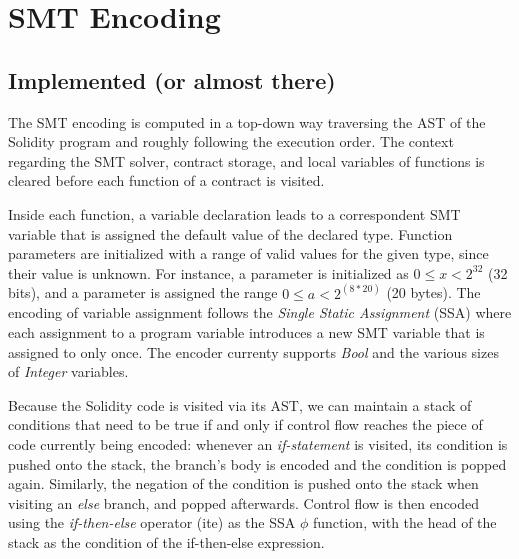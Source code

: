 \section{SMT Encoding}
\label{section:smt}

\subsection{Implemented (or almost there)}


The SMT encoding is computed in a top-down way traversing the AST of the
Solidity program and roughly following the execution order.
The context regarding the SMT solver, contract storage, and
local variables of functions is cleared before each function of a contract is
visited.

Inside each function, a variable declaration leads to a correspondent SMT
variable that is assigned the default value of the declared type.
%
Function parameters are initialized with a range of valid values for the given
type, since their value is unknown.  For instance, a parameter 
is initialized as $0 \le x < 2^{32}$ (32 bits), and a parameter  is assigned the range $0 \le a < 2^{(8*20)}$ (20 bytes).
%
The encoding of variable assignment follows the \emph{Single Static Assignment}
(SSA) where each assignment to a program variable introduces a new SMT variable
that is assigned to only once.
%
The encoder currenty supports \emph{Bool} and the various sizes of
\emph{Integer} variables.

Because the Solidity code is visited via its AST, we can maintain a stack of
conditions that need to be true if and only if control flow
reaches the piece of code currently being encoded: whenever an
\emph{if-statement} is visited, its condition is pushed onto the stack, the
branch's body is encoded and the condition is popped again.
%
Similarly, the negation of the condition is pushed onto the stack when visiting
an \emph{else} branch, and popped afterwards.
%
Control flow is then encoded using the \emph{if-then-else} operator (ite) as
the SSA $\phi$ function, with the head of the stack as the condition of the
if-then-else expression.

